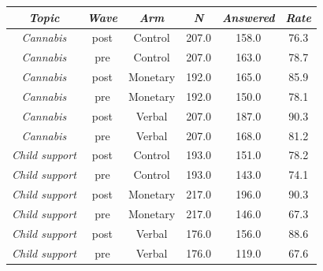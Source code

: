 \begin{tabular}{c c c c c c}
      \hline
      \textit{Topic} & \textit{Wave} & \textit{Arm} & \textit{N} & \textit{Answered} & \textit{Rate} \\
      \hline
      \textit{Cannabis} & post & Control & 207.0 & 158.0 & 76.3 \\
      \textit{Cannabis} & pre & Control & 207.0 & 163.0 & 78.7 \\
      \textit{Cannabis} & post & Monetary & 192.0 & 165.0 & 85.9 \\
      \textit{Cannabis} & pre & Monetary & 192.0 & 150.0 & 78.1 \\
      \textit{Cannabis} & post & Verbal & 207.0 & 187.0 & 90.3 \\
      \textit{Cannabis} & pre & Verbal & 207.0 & 168.0 & 81.2 \\
      \textit{Child support} & post & Control & 193.0 & 151.0 & 78.2 \\
      \textit{Child support} & pre & Control & 193.0 & 143.0 & 74.1 \\
      \textit{Child support} & post & Monetary & 217.0 & 196.0 & 90.3 \\
      \textit{Child support} & pre & Monetary & 217.0 & 146.0 & 67.3 \\
      \textit{Child support} & post & Verbal & 176.0 & 156.0 & 88.6 \\
      \textit{Child support} & pre & Verbal & 176.0 & 119.0 & 67.6 \\
      \hline
    \end{tabular}